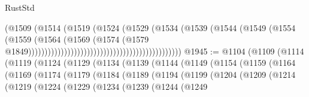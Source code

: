 \begin{lexlean}{RustStd}
\begin{coremodule}
                                                                    (@1509
                                                                      (@1514
                                                                        (@1519
                                                                          (@1524
                                                                            (@1529
                                                                              (@1534
                                                                                (@1539
                                                                                  (@1544
                                                                                    (@1549
                                                                                      (@1554
                                                                                        (@1559
                                                                                          (@1564
                                                                                            (@1569
                                                                                              (@1574
                                                                                                (@1579
                                                                                                  @1849)))))))))))))))))))))))))))))))))))))))))))))))
@1945 := @1104
    (@1109
      (@1114
        (@1119
          (@1124
            (@1129
              (@1134
                (@1139
                  (@1144
                    (@1149
                      (@1154
                        (@1159
                          (@1164
                            (@1169
                              (@1174
                                (@1179
                                  (@1184
                                    (@1189
                                      (@1194
                                        (@1199
                                          (@1204
                                            (@1209
                                              (@1214
                                                (@1219
                                                  (@1224
                                                    (@1229
                                                      (@1234
                                                        (@1239
                                                          (@1244
                                                            (@1249

\end{coremodule}
\end{lexlean}
